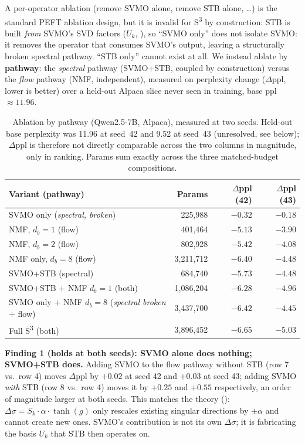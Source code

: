 \documentclass[conference]{IEEEtran}
\newcommand{\sthree}{S\textsuperscript{3}}
\begin{document}
A per-operator ablation (remove SVMO alone, remove STB alone, \ldots) is the standard PEFT ablation design, but it is invalid for \sthree{} by construction: STB is built \emph{from} SVMO's SVD factors ($U_k$, ), so ``SVMO only'' does not isolate SVMO: it removes the operator that consumes SVMO's output, leaving a structurally broken spectral pathway. ``STB only'' cannot exist at all. We instead ablate by \textbf{pathway}: the \textit{spectral} pathway (SVMO+STB, coupled by construction) versus the \textit{flow} pathway (NMF, independent), measured on perplexity change ($\Delta$ppl, lower is better) over a held-out Alpaca slice never seen in training, base ppl $\approx 11.96$.

\begin{table}[t]
\centering
\caption{Ablation by pathway (Qwen2.5-7B, Alpaca), measured at two seeds. Held-out base perplexity was 11.96 at seed~42 and 9.52 at seed~43 (unresolved, see below); $\Delta$ppl is therefore not directly comparable across the two columns in magnitude, only in ranking. Params sum exactly across the three matched-budget compositions.}
\label{tab:pathways}
\centering
\begin{tabular}{@{}lrrr@{}}
\toprule
\textbf{Variant (pathway)} & \textbf{Params} & \textbf{$\Delta$ppl (42)} & \textbf{$\Delta$ppl (43)} \\
\midrule
SVMO only (\textit{spectral, broken}) & 225,988 & $-0.32$ & $-0.18$ \\
NMF, $d_b{=}1$ (flow) & 401,464 & $-5.13$ & $-3.90$ \\
NMF, $d_b{=}2$ (flow) & 802,928 & $-5.42$ & $-4.08$ \\
NMF only, $d_b{=}8$ (flow) & 3,211,712 & $-6.40$ & $-4.48$ \\
SVMO+STB (spectral) & 684,740 & $-5.73$ & $-4.48$ \\
SVMO+STB + NMF $d_b{=}1$ (both) & 1,086,204 & $-6.28$ & $-4.96$ \\
SVMO only + NMF $d_b{=}8$ (\textit{spectral broken} + flow) & 3,437,700 & $-6.42$ & $-4.45$ \\
Full \sthree{} (both) & 3,896,452 & $-6.65$ & $-5.03$ \\
\bottomrule
\end{tabular}
\end{table}

\textbf{Finding 1 (holds at both seeds): SVMO alone does nothing; SVMO+STB does.} Adding SVMO to the flow pathway without STB (row 7 vs.\ row 4) moves $\Delta$ppl by $+0.02$ at seed 42 and $+0.03$ at seed 43; adding SVMO \emph{with} STB (row 8 vs.\ row 4) moves it by $+0.25$ and $+0.55$ respectively, an order of magnitude larger at both seeds. This matches the theory (): $\Delta\sigma = S_k \cdot \alpha \cdot \tanh(g)$ only rescales existing singular directions by $\pm\alpha$ and cannot create new ones. SVMO's contribution is not its own $\Delta\sigma$; it is fabricating the basis $U_k$ that STB then operates on.
\end{document}
